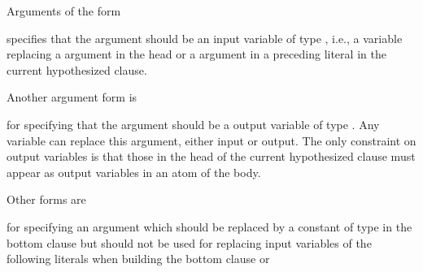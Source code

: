 \documentclass[letterpaper,10pt,english]{sphinxmanual}
\begin{document}
\sphinxAtStartPar
Arguments of the form

\begin{sphinxVerbatim}[commandchars=\\\{\}]
\end{sphinxVerbatim}

\sphinxAtStartPar
specifies that the argument should be an input variable of type , i.e., a variable replacing a  argument in the head or a  argument in a preceding literal in the current hypothesized clause.

\sphinxAtStartPar
Another argument form is

\begin{sphinxVerbatim}[commandchars=\\\{\}]
\end{sphinxVerbatim}

\sphinxAtStartPar
for specifying that the argument should be a output variable of type .
Any variable can replace this argument, either input or output.
The only constraint on output variables is that those in the head of the current hypothesized clause must appear as output variables in an atom of the body.

\sphinxAtStartPar
Other forms are

\begin{sphinxVerbatim}[commandchars=\\\{\}]
\end{sphinxVerbatim}

\sphinxAtStartPar
for specifying an argument which should be replaced by a constant of type  in the bottom clause but should not be used for replacing input variables of the following literals when building the bottom clause or

\begin{sphinxVerbatim}[commandchars=\\\{\}]
\end{sphinxVerbatim}
\end{document}

